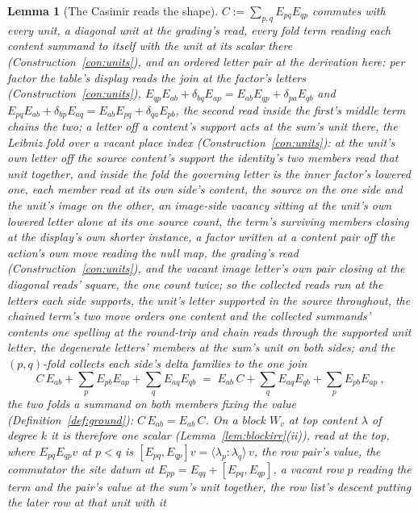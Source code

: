 \documentclass[11pt]{article}
\newtheorem{lemma}{Lemma}
\theoremstyle{definition}
\begin{document}
\begin{lemma}[The Casimir reads the shape]\label{lem:casimir}
$C:=\sum_{p,q}E_{pq}E_{qp}$ commutes with every unit, a diagonal
unit at the grading's read, every fold term reading each content
summand to itself with the unit at its scalar there
(Construction~\ref{con:units}), and an ordered letter pair at the
derivation here: per factor
the table's display reads the join at the factor's letters
(Construction~\ref{con:units}),
$E_{qp}E_{ab}+\delta_{bq}E_{ap}=E_{ab}E_{qp}+\delta_{pa}E_{qb}$
and
$E_{pq}E_{ab}+\delta_{bp}E_{aq}=E_{ab}E_{pq}+\delta_{qa}E_{pb}$,
the second read inside the first's middle term chains the two; a
letter off a content's support acts at the sum's unit there, the
Leibniz fold over a vacant place index
(Construction~\ref{con:units}): at the unit's own letter off the
source content's support the identity's two members read that
unit together, and inside the fold the governing letter is the
inner factor's lowered one, each member read at its own side's
content, the source on the one side and the unit's image on the
other, an image-side vacancy sitting at the unit's own lowered
letter alone at its one source count, the term's surviving
members closing at the display's own shorter instance, a factor
written at a content pair off the action's own move reading the
null map, the grading's read (Construction~\ref{con:units}), and
the vacant image letter's own pair closing at the diagonal reads'
square, the one count twice; so the collected reads run at the
letters each side supports, the unit's letter supported in the
source throughout, the chained term's two move orders one content
and the collected summands' contents one spelling at the
round-trip and chain reads through the supported unit letter, the
degenerate letters' members at the sum's unit on both sides; and
the $(p,q)$-fold collects each side's delta families to the one
join
\[
C\,E_{ab}+\sum_pE_{pb}E_{ap}+\sum_qE_{aq}E_{qb}
\;=\;E_{ab}\,C+\sum_qE_{aq}E_{qb}+\sum_pE_{pb}E_{ap}\ ,
\]
the two folds a summand on both members fixing the value
(Definition~\ref{def:ground}): $C\,E_{ab}=E_{ab}\,C$. On a
block $W_v$ at top content $\lambda$ of degree $k$ it is therefore one
scalar (Lemma~\ref{lem:blockirr}(ii)), read at the top, where
$E_{pq}E_{qp}v$ at $p<q$ is $[E_{pq},E_{qp}]v
=\langle\lambda_p\!:\!\lambda_q\rangle\,v$, the row pair's value, the
commutator the site
datum at $E_{pp}=E_{qq}+[E_{pq},E_{qp}]$, a vacant row $p$ reading
the term and the pair's value at the sum's unit together, the row
list's descent putting the later row at that unit with it

\end{lemma}
\end{document}
